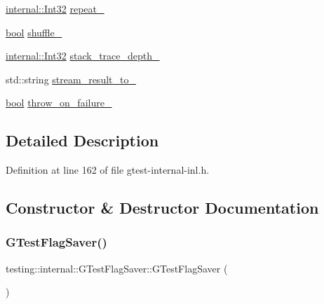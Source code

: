 \begin{DoxyCompactItemize}
\hyperlink{namespacetesting_1_1internal_a8ee38faaf875f133358abaf9bc056cec}{internal\+::\+Int32} \hyperlink{classtesting_1_1internal_1_1GTestFlagSaver_a4c6949cb53b5a89568649d34f8abb5f6}{repeat\+\_\+}
\item 
\hyperlink{classbool}{bool} \hyperlink{classtesting_1_1internal_1_1GTestFlagSaver_af69cb62f7ee26542dd8588507142b478}{shuffle\+\_\+}
\item 
\hyperlink{namespacetesting_1_1internal_a8ee38faaf875f133358abaf9bc056cec}{internal\+::\+Int32} \hyperlink{classtesting_1_1internal_1_1GTestFlagSaver_a42573c1d61af50aae7e855cb1be07d8d}{stack\+\_\+trace\+\_\+depth\+\_\+}
\item 
std\+::string \hyperlink{classtesting_1_1internal_1_1GTestFlagSaver_a603db2b9ec601e80c18af84b4f5faa13}{stream\+\_\+result\+\_\+to\+\_\+}
\item 
\hyperlink{classbool}{bool} \hyperlink{classtesting_1_1internal_1_1GTestFlagSaver_a9fc0b96db6debd9ff80032eb4c84dc28}{throw\+\_\+on\+\_\+failure\+\_\+}
\end{DoxyCompactItemize}


\subsection{Detailed Description}


Definition at line 162 of file gtest-\/internal-\/inl.\+h.



\subsection{Constructor \& Destructor Documentation}
\mbox{\label{classtesting_1_1internal_1_1GTestFlagSaver_ad94262f7765927bbe9a08e25f9c67530}} 
\subsubsection{\texorpdfstring{G\+Test\+Flag\+Saver()}{GTestFlagSaver()}}
{\footnotesize\ttfamily testing\+::internal\+::\+G\+Test\+Flag\+Saver\+::\+G\+Test\+Flag\+Saver (\begin{DoxyParamCaption}{ }\end{DoxyParamCaption})\hspace{0.3cm}{\ttfamily [inline]}}



